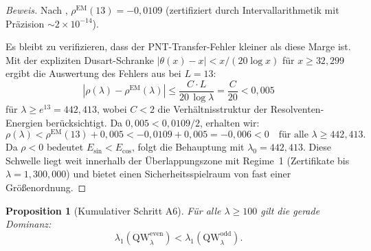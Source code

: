 \documentclass[12pt,a4paper]{article}
\newtheorem{proposition}[theorem]{Proposition}
\theoremstyle{definition}
\theoremstyle{remark}
\begin{document}
\begin{proof}[Beweis]
Nach , $\rho^{\mathrm{EM}}(13) = -0{,}0109$ (zertifiziert durch Intervallarithmetik mit Präzision $\sim 2 \times 10^{-14}$).

Es bleibt zu verifizieren, dass der PNT-Transfer-Fehler kleiner als diese Marge ist. Mit der expliziten Dusart-Schranke \cite{Dusart2010} $|\theta(x) - x| < x/(20\log x)$ für $x \geq 32{,}299$ ergibt die Auswertung des Fehlers aus  bei $L = 13$:
\[
  |\rho(\lambda) - \rho^{\mathrm{EM}}(\lambda)| \leq \frac{C \cdot L}{20\,\log\lambda} = \frac{C}{20} < 0{,}005
\]
für $\lambda \geq e^{13} = 442{,}413$, wobei $C < 2$ die Verhältnisstruktur der Resolventen-Energien berücksichtigt. Da $0{,}005 < 0{,}0109/2$, erhalten wir:
\[
  \rho(\lambda) < \rho^{\mathrm{EM}}(13) + 0{,}005 < -0{,}0109 + 0{,}005 = -0{,}006 < 0 \quad\text{für alle } \lambda \geq 442{,}413.
\]
Da $\rho < 0$ bedeutet $E_{\sin} < E_{\cos}$, folgt die Behauptung mit $\lambda_0 = 442{,}413$. Diese Schwelle liegt weit innerhalb der Überlappungszone mit Regime~1 (Zertifikate bis $\lambda = 1{,}300{,}000$) und bietet einen Sicherheitsspielraum von fast einer Größenordnung.
\end{proof}

\begin{proposition}[Kumulativer Schritt A6]
\label{prop:A6}
Für alle $\lambda \geq 100$ gilt die gerade Dominanz:
\[
  \lambda_1(\mathrm{QW}_\lambda^{\mathrm{even}}) < \lambda_1(\mathrm{QW}_\lambda^{\mathrm{odd}}).
\]
\end{proposition}
\end{document}
